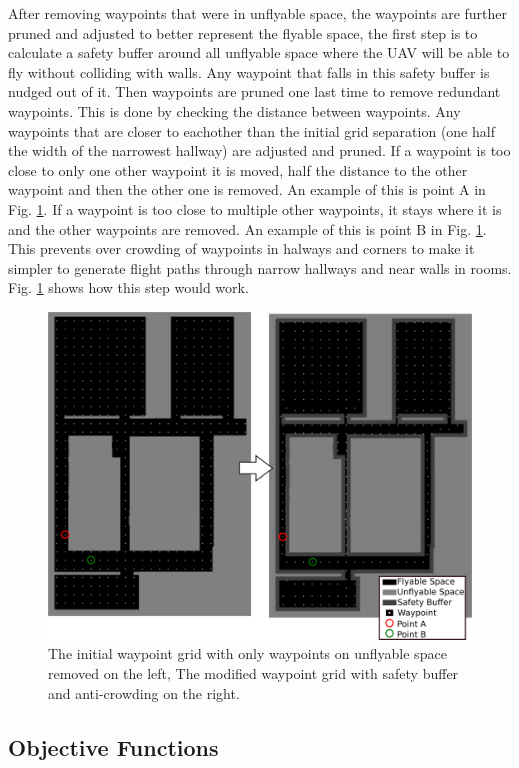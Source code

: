 \documentclass[letterpaper, 10 pt, conference]{ieeeconf}  %
\begin{document}
After removing waypoints that were in unflyable space, the waypoints are further pruned and adjusted to better represent the flyable space, the first step is to calculate a safety buffer around all unflyable space where the UAV will be able to fly without colliding with walls. Any waypoint that falls in this safety buffer is nudged out of it. Then waypoints are pruned one last time to remove redundant waypoints. This is done by checking the distance between waypoints. Any waypoints that are closer to eachother than the initial grid separation (one half the width of the narrowest hallway) are adjusted and pruned. If a waypoint is too close to only one other waypoint it is moved, half the distance to the other waypoint and then the other one is removed. An example of this is point A in Fig. \ref{fig:waypoints}. If a waypoint is too close to multiple other waypoints, it stays where it is and the other waypoints are removed. An example of this is point B in Fig. \ref{fig:waypoints}. This prevents over crowding of waypoints in halways and corners to make it simpler to generate flight paths through narrow hallways and near walls in rooms. Fig. \ref{fig:waypoints} shows how this step would work.

\begin{figure}
\centering
\includegraphics[width=0.8\linewidth]{figures/waypoint2.png}
\caption{The initial waypoint grid with only waypoints on unflyable space removed on the left, The modified waypoint grid with safety buffer and anti-crowding on the right.}
\label{fig:waypoints}
\end{figure}

\subsection{Objective Functions}
\end{document}
